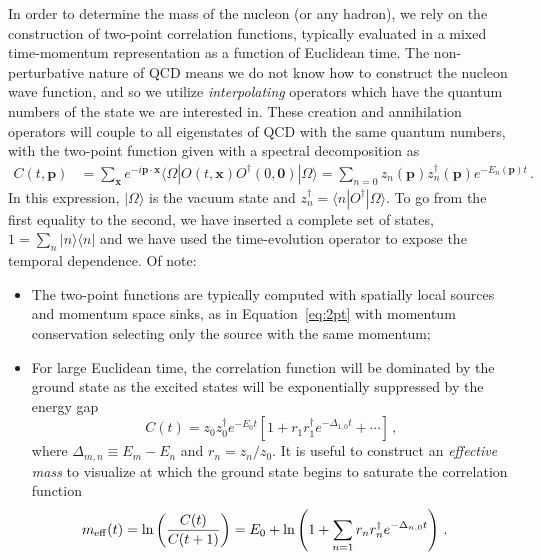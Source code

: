 In order to determine the mass of the nucleon (or any hadron), we rely on the construction of two-point correlation functions, typically evaluated in a mixed time-momentum representation as a function of Euclidean time.
The non-perturbative nature of QCD means we do not know how to construct the nucleon wave function, and so we utilize \textit{interpolating} operators which have the quantum numbers of the state we are interested in.
These creation and annihilation operators will couple to all eigenstates of QCD with the same quantum numbers, with the two-point function given with a spectral decomposition as
\begin{align}\label{eq:2pt}
    C(t,\mathbf{p}) &= \sum_{\mathbf{x}} e^{-i \mathbf{p\cdot x}}
        \langle \Omega| O(t,\mathbf{x}) O^\dagger(0,\mathbf{0}) | \Omega \rangle
    =
    \sum_{n=0} z_n(\mathbf{p}) z_n^\dagger(\mathbf{p}) e^{-E_n(\mathbf{p})t}\, .
\end{align}
In this expression, $|\Omega\rangle$ is the vacuum state and $z_n^\dagger = \langle n|O^\dagger|\Omega\rangle$.
To go from the first equality to the second, we have inserted a complete set of states, $1=\sum_n |n\rangle\langle n|$ and we have used the time-evolution operator to expose the temporal dependence.
Of note:
\begin{itemize}[leftmargin=*]
\item The two-point functions are typically computed with spatially local sources and momentum space sinks, as in Equation~\eqref{eq:2pt} with momentum conservation selecting only the source with the same momentum;

\item For large Euclidean time, the correlation function will be dominated by the ground state as the excited states will be exponentially suppressed by the energy gap
\begin{equation}
    C(t) = z_0 z_0^\dagger e^{-E_0 t}\left[
        1 + r_1 r^\dagger_1 e^{-\Delta_{1,0}t} + \cdots \right]\, ,
\end{equation}
where $\Delta_{m,n} \equiv E_m - E_n$ and $r_n = z_n / z_0$.
It is useful to construct an \textit{effective mass} to visualize at which the ground state begins to saturate the correlation function
\begin{align}
m_{\rm eff}(t) &= \ln \left( \frac{C(t)}{C(t+1)} \right)
    =
    E_0 + \ln\left( 1 + \sum_{n=1} r_n r^\dagger_n e^{-\Delta_{n,0}t}\right)\, .
\end{align}

\end{itemize}
